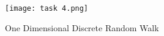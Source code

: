 \documentclass[a4paper, 11pt]{book} %
\begin{document}
\begin{figure}[h]
	\centering
	\texttt{[image: task 4.png]}
	\caption{One Dimensional Discrete Random Walk}
	\label{fig:mesh4}
\end{figure}



\newpage
{}
\begin{thebibliography}{9}
	
	
	
	
	
\end{thebibliography}
  
\end{document}
